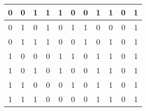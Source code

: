 \documentclass{article}
\begin{document}
\begin{enumerate}
\begin{enumerate}
\begin{center}
\begin{tabular}{|c|c|c|c|c|c|c|c|c|c|c|}
                          0   & 0   & 1   & 1              & 1              & 0              & 0                     & 1                     & 1          & 0                                                                  & 1                                                                      \\ \hline
                          0   & 1   & 0   & 1              & 0              & 1              & 1                     & 0                     & 0          & 0                                                                  & 1                                                                      \\ \hline
                          0   & 1   & 1   & 1              & 0              & 0              & 1                     & 0                     & 1          & 0                                                                  & 1                                                                      \\ \hline
                          1   & 0   & 0   & 0              & 1              & 1              & 0                     & 1                     & 1          & 0                                                                  & 1                                                                      \\ \hline
                          1   & 0   & 1   & 0              & 1              & 0              & 0                     & 1                     & 1          & 0                                                                  & 1                                                                      \\ \hline
                          1   & 1   & 0   & 0              & 0              & 1              & 0                     & 1                     & 1          & 0                                                                  & 1                                                                      \\ \hline
                          1   & 1   & 1   & 0              & 0              & 0              & 0                     & 1                     & 1          & 0                                                                  & 1                                                                      \\ \hline
                      \end{tabular}
                  \end{center}
        \end{enumerate}

\end{enumerate}
\end{document}
